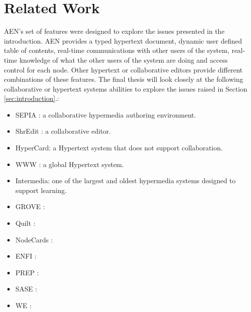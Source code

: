 \section{Related Work}
\label{sec:related-work}
AEN's set of features were designed to explore the issues presented in the
introduction.  AEN provides a typed hypertext document, dynamic user
defined table of contents, real-time communications with other users of the
system, real-time knowledge of what the other users of the system are doing
and access control for each node.  Other hypertext or collaborative editors
provide different combinations of these features.  The final thesis will
look closely at the following collaborative or hypertext
systems abilities to explore the issues raised in Section \ref{sec:introduction}.:\begin{itemize}
\item{SEPIA \cite{Haak92}: a collaborative hypermedia authoring environment.}
\item{ShrEdit \cite{Cogn90}: a collaborative editor.}
\item{HyperCard: a Hypertext system that does not support collaboration.}
\item{WWW \cite{WWW94}: a global Hypertext system.}
\item{Intermedia: one of the largest and oldest hypermedia systems designed
to support learning.}
\item{GROVE \cite{Elli88}:}
\item{Quilt \cite{Fish88}:}
\item{NodeCards \cite{Hal87,Tri88,MI89}:}
\item{ENFI \cite{BPB93}:}
\item{PREP \cite{NKCM90,NCK+92}:}
\item{SASE \cite{BNPM93}:}
\item{WE \cite{SWF87}:}
\end{itemize}



